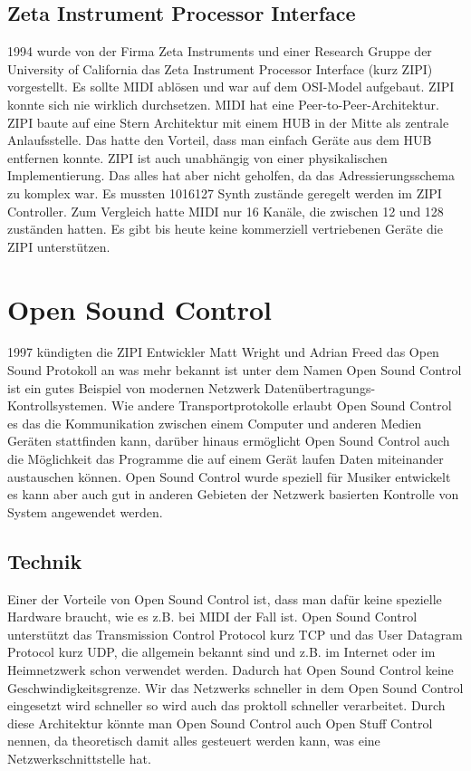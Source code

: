 \documentclass[a4paper, 12pt]{article}
\begin{document}
\subsection {Zeta Instrument Processor Interface}
1994 wurde von der Firma Zeta Instruments und einer Research Gruppe der University of California das Zeta Instrument Processor Interface (kurz ZIPI) vorgestellt. Es sollte MIDI ablösen und war auf dem OSI-Model aufgebaut. ZIPI konnte sich nie wirklich durchsetzen. MIDI hat eine Peer-to-Peer-Architektur. ZIPI baute auf eine Stern Architektur mit einem HUB in der Mitte als zentrale Anlaufsstelle. Das hatte den Vorteil, dass man einfach Geräte aus dem HUB entfernen konnte. ZIPI ist auch unabhängig von einer physikalischen Implementierung. Das alles hat aber nicht geholfen, da das Adressierungsschema zu komplex war. Es mussten 1016127 Synth zustände geregelt werden im ZIPI Controller. Zum Vergleich hatte MIDI nur 16 Kanäle, die zwischen 12 und 128 zuständen hatten.
Es gibt bis heute keine kommerziell vertriebenen Geräte die ZIPI unterstützen.
\newpage
\section{Open Sound Control}
1997 kündigten die ZIPI Entwickler Matt Wright und Adrian Freed das Open Sound Protokoll an was mehr bekannt ist unter dem Namen Open Sound Control ist ein gutes Beispiel von modernen Netzwerk Datenübertragungs-Kontrollsystemen. Wie andere Transportprotokolle erlaubt Open Sound Control es das die Kommunikation zwischen einem Computer und anderen Medien Geräten stattfinden kann, darüber hinaus ermöglicht Open Sound Control auch die Möglichkeit das Programme die auf einem Gerät laufen Daten miteinander austauschen können. Open Sound Control wurde speziell für Musiker entwickelt es kann aber auch gut in anderen Gebieten der Netzwerk basierten Kontrolle von System angewendet werden. 

\subsection{Technik}
Einer der Vorteile von Open Sound Control ist, dass man dafür keine spezielle Hardware braucht, wie es z.B. bei MIDI der Fall ist. Open Sound Control unterstützt das Transmission Control Protocol kurz TCP und das User Datagram Protocol kurz UDP, die allgemein bekannt sind und z.B. im Internet oder im Heimnetzwerk schon verwendet werden. Dadurch hat Open Sound Control keine Geschwindigkeitsgrenze. Wir das Netzwerks schneller in dem Open Sound Control eingesetzt wird schneller so wird auch das proktoll schneller verarbeitet. Durch diese Architektur könnte man Open Sound Control auch Open Stuff Control nennen, da theoretisch damit alles gesteuert werden kann, was eine Netzwerkschnittstelle hat.
\end{document}
